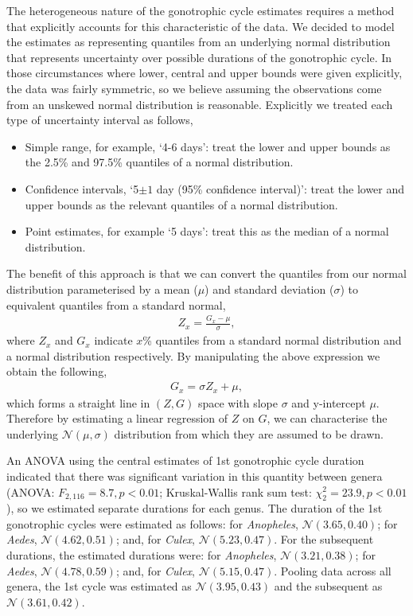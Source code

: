 \documentclass[12pt]{article}
\begin{document}
{The heterogeneous nature of the gonotrophic cycle estimates requires a method that explicitly accounts for this characteristic of the data. We decided to model the estimates as representing quantiles from an underlying normal distribution that represents uncertainty over possible durations of the gonotrophic cycle. In those circumstances where lower, central and upper bounds were given explicitly, the data was fairly symmetric, so we believe assuming the observations come from an unskewed normal distribution is reasonable. Explicitly we treated each type of uncertainty interval as follows,

\begin{itemize}
	\item Simple range, for example, `4-6 days': treat the lower and upper bounds as the 2.5\% and 97.5\% quantiles of a normal distribution.
	\item Confidence intervals, `5$\pm 1$ day (95\% confidence interval)': treat the lower and upper bounds as the relevant quantiles of a normal distribution.
	\item Point estimates, for example `5 days': treat this as the median of a normal distribution.
\end{itemize}

The benefit of this approach is that we can convert the quantiles from our normal distribution parameterised by a mean ($\mu$) and standard deviation ($\sigma$) to equivalent quantiles from a standard normal,
%
\begin{align}
Z_{x} = \frac{G_{x} - \mu}{\sigma},
\end{align}
%
where $Z_{x}$ and $G_{x}$ indicate $x$\% quantiles from a standard normal distribution and a normal distribution respectively. By manipulating the above expression we obtain the following,
%
\begin{align}
G_{x} = \sigma Z_{x} + \mu,
\end{align}
%
which forms a straight line in $(Z,G)$ space with slope $\sigma$ and y-intercept $\mu$. Therefore by estimating a linear regression of $Z$ on $G$, we can characterise the underlying $\mathcal{N}(\mu,\sigma)$ distribution from which they are assumed to be drawn.

An ANOVA using the central estimates of 1st gonotrophic cycle duration indicated that there was significant variation in this quantity between genera (ANOVA: $F_{2,116}=8.7,p<0.01$; Kruskal-Wallis rank sum test: $\chi^2_2=23.9,p<0.01$), so we estimated separate durations for each genus. The duration of the 1st gonotrophic cycles were estimated as follows: for \textit{Anopheles}, $\mathcal{N}(3.65, 0.40)$; for \textit{Aedes}, $\mathcal{N}(4.62, 0.51)$; and, for \textit{Culex}, $\mathcal{N}(5.23, 0.47)$. For the subsequent durations, the estimated durations were: for \textit{Anopheles}, $\mathcal{N}(3.21, 0.38)$; for \textit{Aedes}, $\mathcal{N}(4.78, 0.59)$; and, for \textit{Culex}, $\mathcal{N}(5.15, 0.47)$. Pooling data across all genera, the 1st cycle was estimated as $\mathcal{N}(3.95, 0.43)$ and the subsequent as $\mathcal{N}(3.61, 0.42)$.

}
\end{document}
